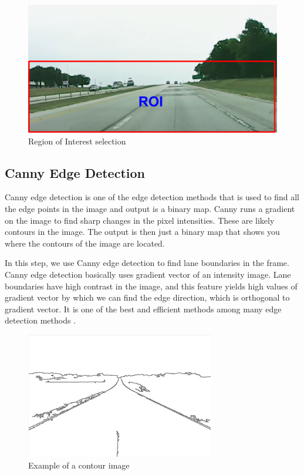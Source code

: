 \begin{figure}
\begin{center}
    \includegraphics[scale=0.6]{img/lane3.png}
\end{center}
\caption{Region of Interest selection}
\label{fig:lane3}
\end{figure}

\subsection{Canny Edge Detection}

Canny edge detection is one of the edge detection methods that is used to find all the edge points in the image and output is a binary map. Canny runs a gradient on the image to find sharp changes in the pixel intensities. These are likely contours in the image. The output is then just a binary map that shows you where the contours of the image are located. 

In this step, we use Canny edge detection to find lane boundaries in the frame. Canny edge detection basically uses gradient vector of an intensity image. Lane boundaries have high contrast in the image, and this feature yields high values of gradient vector by which we can find the edge direction, which is orthogonal to gradient vector. It is one of the best and efficient methods among many edge detection methods \cite{lane3}.

\begin{figure}
\begin{center}
    \includegraphics[scale=0.6]{img/lane4.png}
\end{center}
\caption{Example of a contour image}
\label{fig:lane4}
\end{figure}

